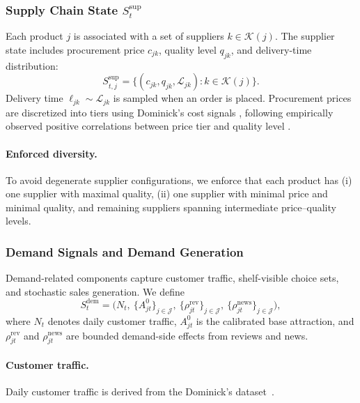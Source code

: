 \subsubsection{Supply Chain State \texorpdfstring{$S_t^{\text{sup}}$}{S t sup}}

Each product $j$ is associated with a set of suppliers $k \in \mathcal{K}(j)$. The supplier state includes procurement price $c_{jk}$, quality level $q_{jk}$, and delivery-time distribution:
\begin{equation}
S_{t,j}^{\text{sup}} =
\big\{(c_{jk}, q_{jk}, \mathcal{L}_{jk}) : k \in \mathcal{K}(j)\big\}.
\end{equation}
Delivery time $\ell_{jk} \sim \mathcal{L}_{jk}$ is sampled when an order is placed. Procurement prices are discretized into tiers using Dominick’s cost signals \citep{DominicksDataset}, following empirically observed positive correlations between price tier and quality level \citep{supplychain}.

\paragraph{Enforced diversity.}
To avoid degenerate supplier configurations, we enforce that each product has (i) one supplier with maximal quality, (ii) one supplier with minimal price and minimal quality, and remaining suppliers spanning intermediate price–quality levels.

\subsubsection{Demand Signals and Demand Generation}
\label{app:demand}

Demand-related components capture customer traffic, shelf-visible choice sets, and stochastic sales generation. We define
\begin{equation}
S_t^{\text{dem}} =
\big(
N_t,\ \{A^0_{jt}\}_{j\in\mathcal{J}},\
\{\rho^{\mathrm{rev}}_{jt}\}_{j\in\mathcal{J}},\
\{\rho^{\mathrm{news}}_{jt}\}_{j\in\mathcal{J}}
\big),
\end{equation}
where $N_t$ denotes daily customer traffic, $A^0_{jt}$ is the calibrated base attraction, and $\rho^{\mathrm{rev}}_{jt}$ and $\rho^{\mathrm{news}}_{jt}$ are bounded demand-side effects from reviews and news.

\paragraph{Customer traffic.}
Daily customer traffic is derived from the Dominick’s dataset~\citep{DominicksDataset}.

